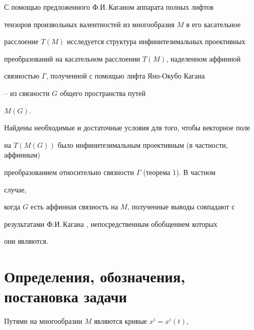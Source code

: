  


 




 


\maketitle 


 




 


С помощью предложенного Ф.И.\,Каганом \cite{Kag1} аппарата полных лифтов 


тензоров произвольных валентностей из многообразия $M$ в его касательное 


расслоение $T(M)$ исследуется структура инфинитезимальных проективных 


преобразований на касательном расслоении $T(M)$, наделенном аффинной 


связностью $\Gamma$, полученной с помощью лифта Яно-Окубо Кагана 


\cite{Yano}--\cite{Kag2} из связности $G$ общего пространства путей 


$M(G)$. 


Найдены необходимые и достаточные условия для того, чтобы векторное поле 


на $T(M(G))$ было инфинитезимальным проективным (в частности, аффинным) 


преобразованием относительно связности $\Gamma$ (теорема 1). В частном 


случае, 


когда $G$ есть аффинная связность на $M$, полученные выводы совпадают с 


результатами Ф.И.\,Кагана \cite{Kag3}, непосредственным обобщением которых 


они являются. 


 


\section{Определения, обозначения, постановка задачи} 


 


Путями на многообразии $M$ являются кривые $x^i=x^i(t)$, 


